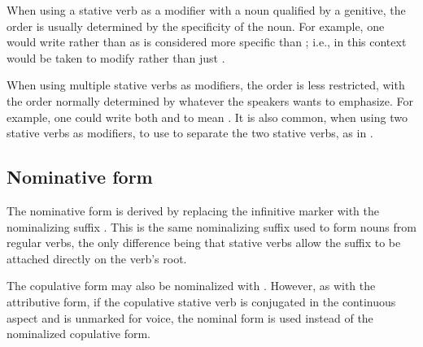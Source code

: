 When using a stative verb as a modifier with a noun qualified by a genitive, the
order is usually determined by the specificity of the noun. For example, one
would write  rather than
 as  is considered more specific than
; i.e., in this context  would be taken to modify
 rather than just .

When using multiple stative verbs as modifiers, the order is less restricted,
with the order normally determined by whatever the speakers wants to emphasize.
For example, one could write both  and  to mean . It is also common, when using two
stative verbs as modifiers, to use  to separate the two stative
verbs, as in .

\subsection{Nominative form}
The nominative form is derived by replacing the infinitive marker  with
the nominalizing suffix . This is the same nominalizing suffix used to
form nouns from regular verbs, the only difference being that stative verbs
allow the suffix to be attached directly on the verb's root.

The copulative form may also be nominalized with .
 However, as with the attributive form, if the copulative
stative verb is conjugated in the continuous aspect and is unmarked for voice,
the nominal form is used instead of the nominalized copulative form.
